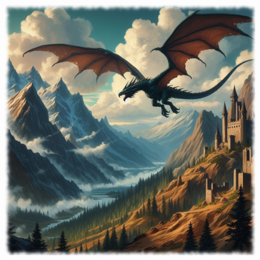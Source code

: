 \begin{figure}[h]
\begin{center}
\includegraphics[scale=0.24]{img/ai-images/wyvern.png}
\end{center}
\end{figure}
